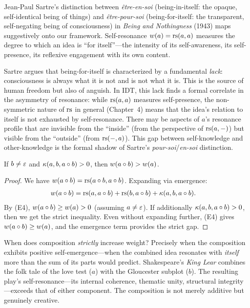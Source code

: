\begin{interpretation}\label{interp:ch3:sartre_being_for_itself}
Jean-Paul Sartre's distinction between \emph{\^{e}tre-en-soi}
(being-in-itself: the opaque, self-identical being of things) and
\emph{\^{e}tre-pour-soi} (being-for-itself: the transparent,
self-negating being of consciousness) in \emph{Being and Nothingness}
(1943) maps suggestively onto our framework. Self-resonance $w(a) =
\mathrm{rs}(a, a)$ measures the degree to which an idea is ``for itself''---the
intensity of its self-awareness, its self-presence, its reflexive
engagement with its own content.

Sartre argues that being-for-itself is characterized by a fundamental
\emph{lack}: consciousness is always what it is not and is not what it is.
This is the source of human freedom but also of anguish. In IDT, this
lack finds a formal correlate in the asymmetry of resonance: while
$\mathrm{rs}(a, a)$ measures self-presence, the non-symmetric nature of $\mathrm{rs}$
in general (Chapter~4) means that the idea's relation to itself is not
exhausted by self-resonance. There may be aspects of $a$'s resonance
profile that are invisible from the ``inside'' (from the perspective of
$\mathrm{rs}(a, -)$) but visible from the ``outside'' (from $\mathrm{rs}(-, a)$). This
gap between self-knowledge and other-knowledge is the formal shadow of
Sartre's \emph{pour-soi}/\emph{en-soi} distinction.
\end{interpretation}

\begin{theorem}\label{thm:strict-mono}
If $b \neq \varepsilon$ and $\kappa(a, b, a \circ b) > 0$, then
$w(a \circ b) > w(a)$.
\end{theorem}
\begin{proof}
We have $w(a \circ b) = \mathrm{rs}(a \circ b, a \circ b)$. Expanding
via emergence:
\begin{align*}
    w(a \circ b) &= \mathrm{rs}(a, a \circ b) + \mathrm{rs}(b, a \circ b)
        + \kappa(a, b, a \circ b).
\end{align*}
By (E4), $w(a \circ b) \geq w(a) > 0$ (assuming $a \neq \varepsilon$). If
additionally $\kappa(a, b, a \circ b) > 0$, then we get the strict
inequality. Even without expanding further, (E4) gives
$w(a \circ b) \geq w(a)$, and the emergence term provides the strict
gap.
\end{proof}

\begin{interpretation}
When does composition \emph{strictly} increase weight? Precisely when the
composition exhibits positive self-emergence---when the combined idea
resonates with \emph{itself} more than the sum of its parts would predict.
Shakespeare's \emph{King Lear} combines the folk tale of the love test
($a$) with the Gloucester subplot ($b$). The resulting play's
self-resonance---its internal coherence, thematic unity, structural
integrity---exceeds that of either component. The composition is not merely
additive but genuinely creative.
\end{interpretation}

